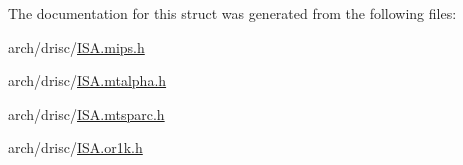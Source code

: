 The documentation for this struct was generated from the following files\+:\begin{DoxyCompactItemize}
\item 
arch/drisc/\hyperlink{_i_s_a_8mips_8h}{I\+S\+A.\+mips.\+h}\item 
arch/drisc/\hyperlink{_i_s_a_8mtalpha_8h}{I\+S\+A.\+mtalpha.\+h}\item 
arch/drisc/\hyperlink{_i_s_a_8mtsparc_8h}{I\+S\+A.\+mtsparc.\+h}\item 
arch/drisc/\hyperlink{_i_s_a_8or1k_8h}{I\+S\+A.\+or1k.\+h}\end{DoxyCompactItemize}
